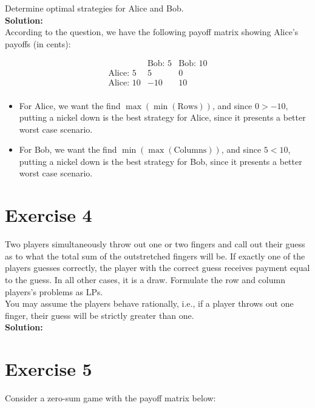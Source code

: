\documentclass{article}
\begin{document}
Determine optimal strategies for Alice and Bob. \\

\textbf{Solution: } \\

According to the question, we have the following payoff matrix showing Alice's payoffs (in cents):

\[
\begin{array}{c|cc}
& \text{Bob: 5} & \text{Bob: 10} \\
\hline
\text{Alice: 5} & 5 & 0 \\
\text{Alice: 10} & -10 & 10 \\
\end{array}
\]

\begin{itemize}
    \item For Alice, we want the find $\max(\min(\text{Rows}))$, and since $0 > -10$, putting a nickel down is the best strategy for Alice, since it presents a better worst case scenario.
    \item For Bob, we want the find $\min(\max(\text{Columns}))$, and since $5 < 10$, putting a nickel down is the best strategy for Bob, since it presents a better worst case scenario.
\end{itemize}

\newpage

\section*{Exercise 4}
Two players simultaneously throw out one or two fingers and call out their guess as to what the total sum of the outstretched fingers will be. If exactly one of the players guesses correctly, the player with the correct guess receives payment equal to the guess. In all other cases, it is a draw. Formulate the row and column players's problems as LPs. \\

You may assume the players behave rationally, i.e., if a player throws out one finger, their guess will be strictly greater than one. \\

\textbf{Solution: } \\



\newpage

\section*{Exercise 5}
Consider a zero-sum game with the payoff matrix below:
\end{document}
